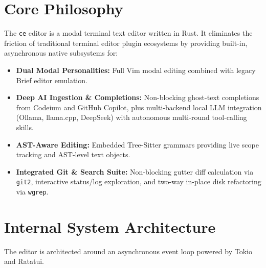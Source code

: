 \documentclass[11pt,a4paper,openany]{book}
\begin{document}
\section{Core Philosophy}
The \texttt{ce} editor is a modal terminal text editor written in Rust. It eliminates the friction of traditional terminal editor plugin ecosystems by providing built-in, asynchronous native subsystems for:
\begin{itemize}[noitemsep]
    \item \textbf{Dual Modal Personalities:} Full Vim modal editing combined with legacy Brief editor emulation.
    \item \textbf{Deep AI Ingestion \& Completions:} Non-blocking ghost-text completions from Codeium and GitHub Copilot, plus multi-backend local LLM integration (Ollama, llama.cpp, DeepSeek) with autonomous multi-round tool-calling skills.
    \item \textbf{AST-Aware Editing:} Embedded Tree-Sitter grammars providing live scope tracking and AST-level text objects.
    \item \textbf{Integrated Git \& Search Suite:} Non-blocking gutter diff calculation via \texttt{git2}, interactive status/log exploration, and two-way in-place disk refactoring via \texttt{wgrep}.
\end{itemize}

\section{Internal System Architecture}
The editor is architected around an asynchronous event loop powered by Tokio and Ratatui.
\end{document}
